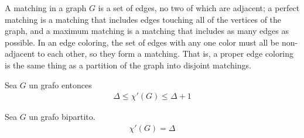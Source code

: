 A matching in a graph $G$ is a set of edges, no two of which are adjacent; a perfect matching is a matching that includes edges touching all of the vertices of the graph, and a maximum matching is a matching that includes as many edges as possible. In an edge coloring, the set of edges with any one color must all be non-adjacent to each other, so they form a matching. That is, a proper edge coloring is the same thing as a partition of the graph into disjoint matchings.

\begin{theorem}[Vizing]
Sea $G$ un grafo entonces 
\begin{align}
    \Delta \le \chi'(G) \le \Delta + 1
\end{align}
\end{theorem}

\begin{theorem}[Kőnig]
Sea $G$ un grafo bipartito.
\begin{align}
    \chi'(G) = \Delta
\end{align}
\end{theorem}
